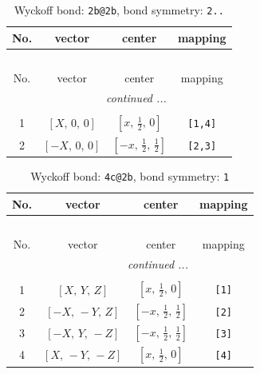 \documentclass[fleqn,8pt]{jsarticle}
\begin{document}
\renewcommand{\arraystretch}{1.2}
\begin{longtable}{cccc}
\caption{Wyckoff bond: {\tt 2b@2b}, bond symmetry: {\tt 2..}}
 \\
 \hline \hline
No. & vector & center & mapping \\ \hline \endfirsthead

\multicolumn{3}{l}{\tablename\ \thetable{}} \\
 \hline \hline
No. & vector & center & mapping \\ \hline \endhead

 \hline \hline
\multicolumn{3}{r}{\footnotesize\it continued ...} \\ \endfoot

 \hline \hline
\multicolumn{3}{r}{} \\ \endlastfoot

1 & $\left[ X,\, 0,\, 0 \right]$ & $\left[ x,\, \frac{1}{2},\, 0 \right]$ & {\tt [1,4]} \\ \hline
2 & $\left[ - X,\, 0,\, 0 \right]$ & $\left[ - x,\, \frac{1}{2},\, \frac{1}{2} \right]$ & {\tt [2,3]} \\
\end{longtable}
\renewcommand{\arraystretch}{1.2}
\begin{longtable}{cccc}
\caption{Wyckoff bond: {\tt 4c@2b}, bond symmetry: {\tt 1}}
 \\
 \hline \hline
No. & vector & center & mapping \\ \hline \endfirsthead

\multicolumn{3}{l}{\tablename\ \thetable{}} \\
 \hline \hline
No. & vector & center & mapping \\ \hline \endhead

 \hline \hline
\multicolumn{3}{r}{\footnotesize\it continued ...} \\ \endfoot

 \hline \hline
\multicolumn{3}{r}{} \\ \endlastfoot

1 & $\left[ X,\, Y,\, Z \right]$ & $\left[ x,\, \frac{1}{2},\, 0 \right]$ & {\tt [1]} \\ \hline
2 & $\left[ - X,\, - Y,\, Z \right]$ & $\left[ - x,\, \frac{1}{2},\, \frac{1}{2} \right]$ & {\tt [2]} \\ \hline
3 & $\left[ - X,\, Y,\, - Z \right]$ & $\left[ - x,\, \frac{1}{2},\, \frac{1}{2} \right]$ & {\tt [3]} \\ \hline
4 & $\left[ X,\, - Y,\, - Z \right]$ & $\left[ x,\, \frac{1}{2},\, 0 \right]$ & {\tt [4]} \\
\end{longtable}
\end{document}
